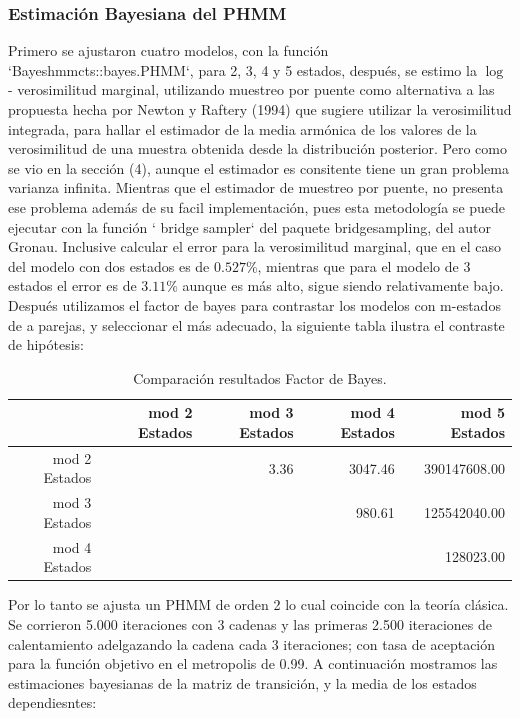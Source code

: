 \documentclass[a4paper]{article}\usepackage[]{graphicx}\usepackage[]{color}
\begin{document}

\clearpage

\subsubsection*{Estimación Bayesiana del PHMM}





Primero se ajustaron cuatro modelos, con la función `Bayeshmmcts::bayes.PHMM`, para 2, 3, 4 y 5 estados, después, se estimo la $\log$ - verosimilitud marginal, utilizando muestreo por puente como alternativa a las propuesta hecha por Newton y Raftery (1994) que sugiere utilizar la verosimilitud integrada, para hallar el estimador de la media armónica de los valores de la verosimilitud de una muestra obtenida desde la distribución posterior. Pero como se vio en la sección (4), aunque el estimador es consitente tiene un gran problema varianza infinita. Mientras que el estimador de muestreo por puente, no presenta ese problema además de su facil implementación, pues esta metodología se puede ejecutar con la función ` bridge sampler` del paquete bridgesampling, del autor Gronau. Inclusive calcular el error para la verosimilitud marginal, que en el caso del modelo con dos estados es de $0.527 \%$, mientras que para el modelo de 3 estados el error es de $3.11 \%$ aunque es más alto, sigue siendo relativamente bajo. Después utilizamos el factor de bayes para contrastar los modelos con m-estados de a parejas, y seleccionar el más adecuado, la siguiente tabla ilustra el contraste de hipótesis:

\begin{table}[ht]
\centering
\begin{tabular}{rrrrr}
  \hline
 & mod 2 Estados & mod 3 Estados & mod 4 Estados & mod 5 Estados \\ 
  \hline
mod 2 Estados &  & 3.36 & 3047.46 & 390147608.00 \\ 
  mod 3 Estados &  &  & 980.61 & 125542040.00 \\ 
  mod 4 Estados &  &  &  & 128023.00 \\ 
   \hline
\end{tabular}
\caption{Comparación resultados Factor de Bayes.} 
\end{table}




Por lo tanto se ajusta un PHMM de orden 2 lo cual coincide con la teoría clásica. Se corrieron 5.000 iteraciones con 3 cadenas y las primeras 2.500 iteraciones de calentamiento adelgazando la cadena cada 3 iteraciones; con tasa de aceptación para la función objetivo en el metropolis de 0.99. A continuación mostramos las estimaciones bayesianas de la matriz de transición, y la media de los estados dependiesntes:
\end{document}
